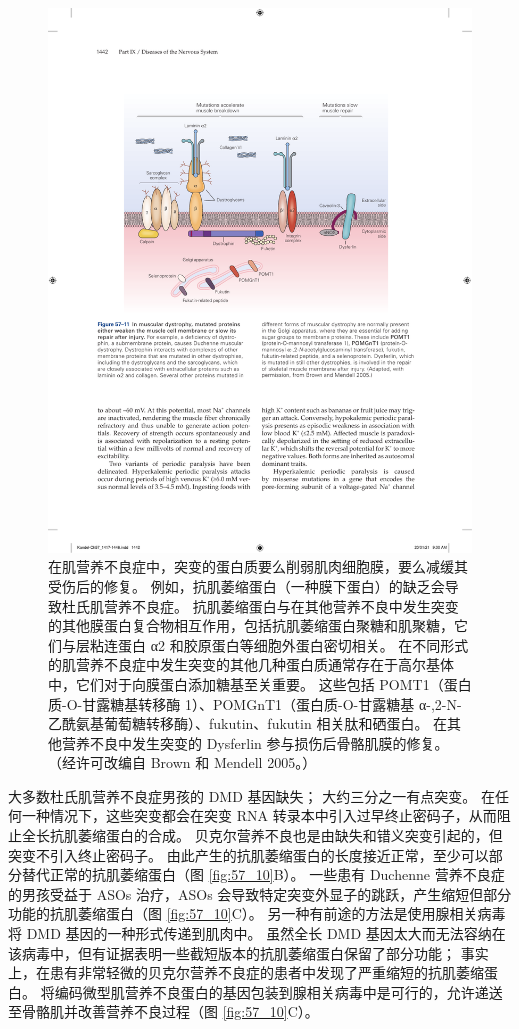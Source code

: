 \begin{figure}[htbp]
	\centering
	\includegraphics[width=0.8\linewidth]{chap57/fig_57_11}
	\caption{在肌营养不良症中，突变的蛋白质要么削弱肌肉细胞膜，要么减缓其受伤后的修复。 例如，抗肌萎缩蛋白（一种膜下蛋白）的缺乏会导致杜氏肌营养不良症。 抗肌萎缩蛋白与在其他营养不良中发生突变的其他膜蛋白复合物相互作用，包括抗肌萎缩蛋白聚糖和肌聚糖，它们与层粘连蛋白 α2 和胶原蛋白等细胞外蛋白密切相关。 在不同形式的肌营养不良症中发生突变的其他几种蛋白质通常存在于高尔基体中，它们对于向膜蛋白添加糖基至关重要。 这些包括 POMT1（蛋白质-O-甘露糖基转移酶 1）、POMGnT1（蛋白质-O-甘露糖基 α-,2-N-乙酰氨基葡萄糖转移酶）、fukutin、fukutin 相关肽和硒蛋白。 在其他营养不良中发生突变的 Dysferlin 参与损伤后骨骼肌膜的修复。 （经许可改编自 Brown 和 Mendell 2005。）}
	\label{fig:57_11}
\end{figure}

大多数杜氏肌营养不良症男孩的 DMD 基因缺失； 大约三分之一有点突变。 在任何一种情况下，这些突变都会在突变 RNA 转录本中引入过早终止密码子，从而阻止全长抗肌萎缩蛋白的合成。 贝克尔营养不良也是由缺失和错义突变引起的，但突变不引入终止密码子。 由此产生的抗肌萎缩蛋白的长度接近正常，至少可以部分替代正常的抗肌萎缩蛋白（图 \ref{fig:57_10}B）。 一些患有 Duchenne 营养不良症的男孩受益于 ASOs 治疗，ASOs 会导致特定突变外显子的跳跃，产生缩短但部分功能的抗肌萎缩蛋白（图 \ref{fig:57_10}C）。 另一种有前途的方法是使用腺相关病毒将 DMD 基因的一种形式传递到肌肉中。 虽然全长 DMD 基因太大而无法容纳在该病毒中，但有证据表明一些截短版本的抗肌萎缩蛋白保留了部分功能； 事实上，在患有非常轻微的贝克尔营养不良症的患者中发现了严重缩短的抗肌萎缩蛋白。 将编码微型肌营养不良蛋白的基因包装到腺相关病毒中是可行的，允许递送至骨骼肌并改善营养不良过程（图 \ref{fig:57_10}C）。

